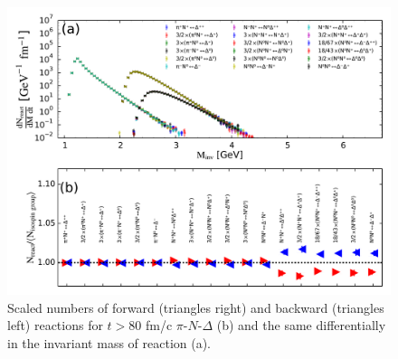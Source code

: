 \begin{figure}
  \includegraphics[width=\textwidth]{plots/smash/detailed_balance/react.pdf}
  \caption{Scaled numbers of forward (triangles right) and backward (triangles left)
           reactions for $t>80$ fm/c $\pi$-$N$-$\Delta$ (b) and the same differentially
           in the invariant mass of reaction (a).}
  \label{fig:pi_N_D_reactions}
\end{figure}

